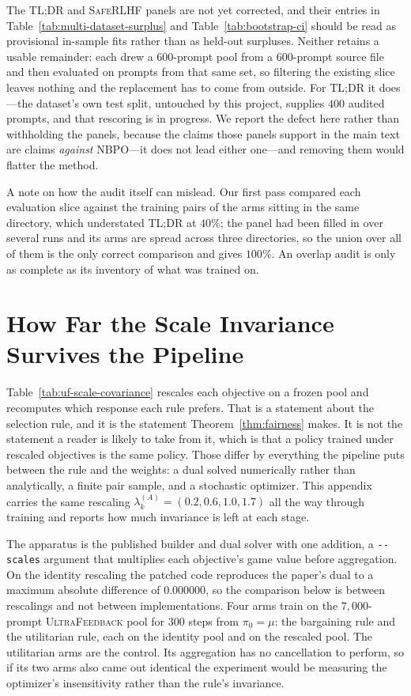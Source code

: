 \documentclass{article}
\theoremstyle{remark}
\theoremstyle{plain}
\newcommand{\NBPO}{\textsc{NBPO}}
\begin{document}
The \textsc{TL;DR} and \textsc{SafeRLHF} panels are not yet corrected, and their entries in
Table~\ref{tab:multi-dataset-surplus} and Table~\ref{tab:bootstrap-ci} should be read as provisional
in-sample fits rather than as held-out surpluses. Neither retains a usable remainder: each drew a
$600$-prompt pool from a $600$-prompt source file and then evaluated on prompts from that same set, so
filtering the existing slice leaves nothing and the replacement has to come from outside. For \textsc{TL;DR}
it does---the dataset's own test split, untouched by this project, supplies $400$ audited prompts, and that
rescoring is in progress. We report the defect here rather than withholding the panels, because the claims
those panels support in the main text are claims \emph{against} \NBPO{}---it does not lead either one---and
removing them would flatter the method.

A note on how the audit itself can mislead. Our first pass compared each evaluation slice against the
training pairs of the arms sitting in the same directory, which understated \textsc{TL;DR} at $40\%$; the
panel had been filled in over several runs and its arms are spread across three directories, so the union
over all of them is the only correct comparison and gives $100\%$. An overlap audit is only as complete as
its inventory of what was trained on.

\section{How Far the Scale Invariance Survives the Pipeline}
\label{app:scale-pipeline}
Table~\ref{tab:uf-scale-covariance} rescales each objective on a frozen pool and recomputes which response
each rule prefers. That is a statement about the selection rule, and it is the statement
Theorem~\ref{thm:fairness} makes. It is not the statement a reader is likely to take from it, which is that
a policy trained under rescaled objectives is the same policy. Those differ by everything the pipeline puts
between the rule and the weights: a dual solved numerically rather than analytically, a finite pair sample,
and a stochastic optimizer. This appendix carries the same rescaling $\lambda^{(A)}_k=(0.2,0.6,1.0,1.7)$
all the way through training and reports how much invariance is left at each stage.

The apparatus is the published builder and dual solver with one addition, a \texttt{-{}-scales} argument
that multiplies each objective's game value before aggregation. On the identity rescaling the patched code
reproduces the paper's dual to a maximum absolute difference of $0.000000$, so the comparison below is
between rescalings and not between implementations. Four arms train on the $7{,}000$-prompt
\textsc{UltraFeedback} pool for $300$ steps from $\pi_0=\mu$: the bargaining rule and the utilitarian rule,
each on the identity pool and on the rescaled pool. The utilitarian arms are the control. Its aggregation
has no cancellation to perform, so if its two arms also came out identical the experiment would be
measuring the optimizer's insensitivity rather than the rule's invariance.
\end{document}
